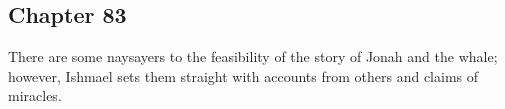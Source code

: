 \subsection{Chapter 83}

There are some naysayers to the feasibility of the story of Jonah and the
whale; however, Ishmael sets them straight with accounts from others and claims
of miracles.
